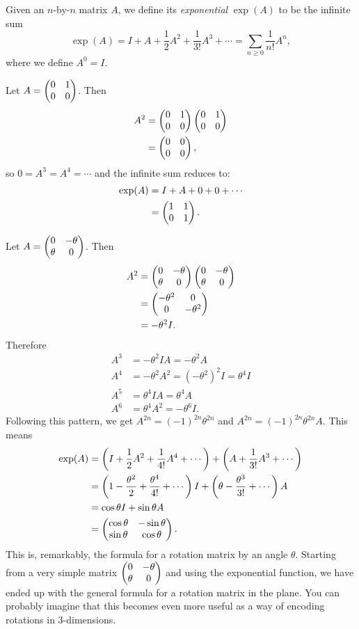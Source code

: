 \documentclass{article}
\begin{document}
\begin{Definition}
Given an \(n\)-by-\(n\) matrix \(A\), we define its {\em
exponential} \(\exp(A)\) to be the infinite sum
\[\exp(A)=I+A+\frac{1}{2}A^2+\frac{1}{3!}A^3+\cdots=\sum_{n\geq
0}\frac{1}{n!}A^n,\] where we define \(A^0=I\).


\end{Definition}
\begin{Example}
Let \(A=\begin{pmatrix} 0 & 1 \\ 0 & 0\end{pmatrix}\). Then
\begin{align*}
A^2&=\begin{pmatrix} 0 & 1 \\ 0 & 0\end{pmatrix}\begin{pmatrix} 0 & 1 \\ 0 & 0\end{pmatrix}\\
&=\begin{pmatrix} 0 & 0 \\ 0 & 0\end{pmatrix},
\end{align*}
so \(0=A^3=A^4=\cdots\) and the infinite sum reduces to:
\begin{align*}
\exp(A)&=I+A+0+0+\cdots\\
&=\begin{pmatrix} 1 & 1 \\ 0 & 1\end{pmatrix}.
\end{align*}


\end{Example}
\begin{Example}
Let \(A=\begin{pmatrix} 0 & -\theta \\ \theta & 0\end{pmatrix}\). Then
\begin{align*}
A^2&=\begin{pmatrix} 0 & -\theta \\ \theta & 0\end{pmatrix}\begin{pmatrix} 0 & -\theta \\ \theta & 0\end{pmatrix}\\
&=\begin{pmatrix} -\theta^2 & 0 \\ 0 & -\theta^2\end{pmatrix}\\
&=-\theta^2I.
\end{align*}
Therefore
\begin{align*}
A^3&=-\theta^2IA=-\theta^2A\\
A^4&=-\theta^2A^2=(-\theta^2)^2I=\theta^4I\\
A^5&=\theta^4IA=\theta^4A\\
A^6&=\theta^4A^2=-\theta^6I.
\end{align*}
Following this pattern, we get \(A^{2n}=(-1)^{2n}\theta^{2n}\) and
\(A^{2n}=(-1)^{2n}\theta^{2n}A\). This means
\begin{align*}
\exp(A)&=\left(I+\frac{1}{2}A^2+\frac{1}{4!}A^4+\cdots\right)+\left(A+\frac{1}{3!}A^3+\cdots\right)\\
&=\left(1-\frac{\theta^2}{2}+\frac{\theta^4}{4!}+\cdots\right)I+\left(\theta-\frac{\theta^3}{3!}+\cdots\right)A\\
&=\cos\theta I+\sin\theta A\\
&=\begin{pmatrix} \cos\theta & -\sin\theta \\ \sin\theta & \cos\theta\end{pmatrix}.
\end{align*}
This is, remarkably, the formula for a rotation matrix by an angle
\(\theta\). Starting from a very simple matrix \(\begin{pmatrix} 0 & -\theta
\\ \theta & 0\end{pmatrix}\) and using the exponential function, we have ended
up with the general formula for a rotation matrix in the plane. You
can probably imagine that this becomes even more useful as a way of
encoding rotations in 3-dimensions.


\end{Example}
\end{document}
